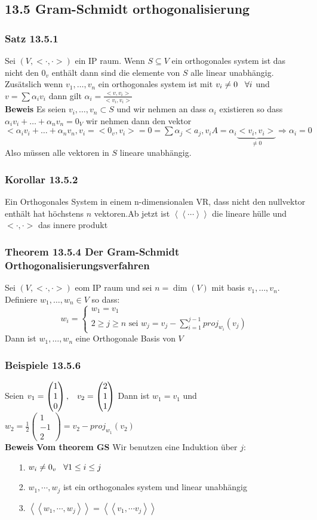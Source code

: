 \documentclass{article}
\newcommand{\smspc}{\hspace{0.3cm}}
\newcommand{\kk}[1]{\left<\left<{#1}\right>\right>}
\newcommand{\satz}[1]{\subsubsection*{Satz {#1}}}
\newcommand{\korollar}[1]{\subsubsection*{Korollar {#1}}}
\newcommand{\beweis}{\\\textbf{Beweis }}
\newcommand{\beispiel}[1]{\subsubsection*{Beispiele {#1}}}
\newcommand{\theorem}[1]{\subsubsection*{Theorem {#1}}}
\begin{document}
\subsection*{13.5 Gram-Schmidt orthogonalisierung}
\satz{13.5.1} Sei $(V,<\cdot,\cdot>)$ ein IP raum. Wenn $S\subseteq V$ ein orthogonales system ist das nicht den $0_v$ enthält dann sind die elemente von $S$ alle linear unabhängig. Zusätslich wenn $v_1,\hdots,v_n$ ein orthogonales system ist mit $v_i\neq0\smspc\forall i$ und $v=\sum\alpha_i v_i$ dann gilt $\alpha_i=\frac{<v,v_i>}{<v_i,v_i>}$
\beweis Es seien $v_i,\hdots,v_n\subset S$ und wir nehmen an dass $\alpha_i$ existieren so dass $\alpha_iv_i+\hdots+\alpha_nv_n=0_V$ wir nehmen dann den vektor $<\alpha_iv_i+\hdots+\alpha_nv_n,v_i=<0_v,v_i>=0=\sum\alpha_j<a_j,v_iA=\alpha_i\underset{\neq0}{\underbrace{<v_i,v_i>}}\Rightarrow \alpha_i=0$
Also müssen alle vektoren in $S$ lineare unabhängig.
\korollar{13.5.2} Ein Orthogonales System in einem n-dimensionalen VR, dass nicht den nullvektor enthält hat höchstens $n$ vektoren.\newline Ab jetzt ist $\kk{\cdots}$ die lineare hülle und $<\cdot,\cdot>$ das innere produkt
\theorem{13.5.4 Der Gram-Schmidt Orthogonalisierungsverfahren} Sei $(V,<\cdot,\cdot>)$ eom IP raum und sei $n=\dim(V)$ mit basis $v_1,\hdots, v_n$. Definiere $w_1,\hdots,w_n\in V$ so dass:
\[w_i=\left\lbrace\begin{matrix}w_1=v_1\\2\ge j\ge n\text{ sei }w_j=v_j-\sum_{i=1}^{j-1}proj_{w_i}(v_j)\end{matrix}\right.\]
Dann ist $w_1,\hdots,w_n$ eine Orthogonale Basis von $V$
\beispiel{13.5.6} Seien $v_1=\begin{pmatrix}1\\1\\0\end{pmatrix},\smspc v_2=\begin{pmatrix}2\\1\\1\end{pmatrix}$ Dann ist $w_1=v_1$ und $w_2=\frac{1}{2}\begin{pmatrix}1\\-1\\2\end{pmatrix}=v_2-proj_{w_1}(v_2)$
\beweis \textbf{Vom theorem GS} Wir benutzen eine Induktion über $j$:
\begin{itemize}
  \item[1.]{$w_i\neq0_v\smspc\forall 1\le i\le j$}
  \item[2.]{$w_1,\cdots,w_j$ ist ein orthogonales system und linear unabhängig}
  \item[3.]{$\kk{w_1,\cdots,w_j}=\kk{v_1,\cdots v_j}$}
\end{itemize}
\end{document}
